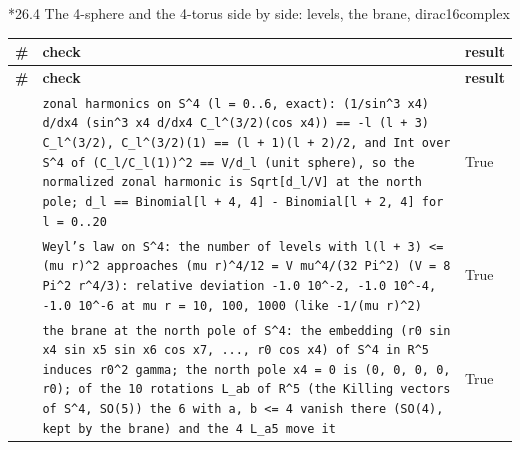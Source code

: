 \documentclass[10pt,a4paper]{article}
\makeatletter
\renewcommand\subsubsection{\@startsection{subsubsection}{3}{\z@}{-3.25ex\@plus -1ex \@minus -.2ex}{1.5ex \@plus .2ex}{\normalfont\normalsize\bfseries\raggedright}}
\makeatother
\begin{document}
\subsubsection*{26.4 The 4-sphere and the 4-torus side by side: levels, the brane, dirac16complex}
{\footnotesize
\begin{longtable}{>{\raggedright\arraybackslash}p{}>{\raggedright\arraybackslash}p{}>{\raggedright\arraybackslash}p{}}
\toprule
\textbf{\#} & \textbf{check} & \textbf{result} \\
\midrule\endfirsthead
\toprule
\textbf{\#} & \textbf{check} & \textbf{result} \\
\midrule\endhead
\endfoot
\bottomrule\endlastfoot
462 & \texttt{zonal harmonics on S\textasciicircum{}4 (l = 0..6, exact): (1/\allowbreak{}sin\textasciicircum{}3 x4) d/\allowbreak{}dx4 (sin\textasciicircum{}3 x4 d/\allowbreak{}dx4 C\_\allowbreak{}l\textasciicircum{}(3/\allowbreak{}2)(cos x4)) == -l (l + 3) C\_\allowbreak{}l\textasciicircum{}(3/\allowbreak{}2), C\_\allowbreak{}l\textasciicircum{}(3/\allowbreak{}2)(1) == (l + 1)(l + 2)/\allowbreak{}2, and Int over S\textasciicircum{}4 of (C\_\allowbreak{}l/\allowbreak{}C\_\allowbreak{}l(1))\textasciicircum{}2 == V/\allowbreak{}d\_\allowbreak{}l (unit sphere), so the normalized zonal harmonic is Sqrt[d\_\allowbreak{}l/\allowbreak{}V] at the north pole; d\_\allowbreak{}l == Binomial[l + 4, 4] - Binomial[l + 2, 4] for l = 0..20} & True \\
463 & \texttt{Weyl's law on S\textasciicircum{}4: the number of levels with l(l + 3) <= (mu r)\textasciicircum{}2 approaches (mu r)\textasciicircum{}4/\allowbreak{}12 = V mu\textasciicircum{}4/\allowbreak{}(32 Pi\textasciicircum{}2) (V = 8 Pi\textasciicircum{}2 r\textasciicircum{}4/\allowbreak{}3): relative deviation -1.0 10\textasciicircum{}-2, -1.0 10\textasciicircum{}-4, -1.0 10\textasciicircum{}-6 at mu r = 10, 100, 1000 (like -1/\allowbreak{}(mu r)\textasciicircum{}2)} & True \\
464 & \texttt{the brane at the north pole of S\textasciicircum{}4: the embedding (r0 sin x4 sin x5 sin x6 cos x7, ..., r0 cos x4) of S\textasciicircum{}4 in R\textasciicircum{}5 induces r0\textasciicircum{}2 gamma; the north pole x4 = 0 is (0, 0, 0, 0, r0); of the 10 rotations L\_\allowbreak{}ab of R\textasciicircum{}5 (the Killing vectors of S\textasciicircum{}4, SO(5)) the 6 with a, b <= 4 vanish there (SO(4), kept by the brane) and the 4 L\_\allowbreak{}a5 move it} & True \\

\end{longtable}}
\end{document}
